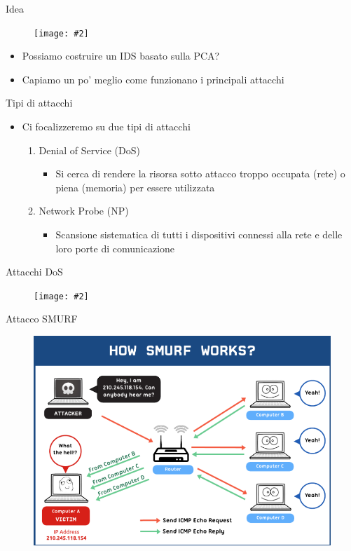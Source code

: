 \documentclass[xcolor={dvipsnames}]{beamer}%
\newcommand{\figcen}[2]{
	\begin{figure}
		\begin{center}
			\texttt{[image: \#2]}
		\end{center}
	\end{figure}
}
\begin{document}
		\begin{frame}{Idea}
			\figcen{.3\textwidth}{idea}
			\begin{itemize}
				\item Possiamo costruire un IDS basato sulla PCA?
				\item Capiamo un po' meglio come funzionano i principali attacchi
			\end{itemize}
		\end{frame}

		\begin{frame}{Tipi di attacchi}
			\begin{itemize}
				\item Ci focalizzeremo su due tipi di attacchi
				\begin{enumerate}
					\footnotesize
					\item Denial of Service (DoS)
					\begin{itemize}
						\footnotesize
						\item Si cerca di rendere la risorsa sotto attacco troppo occupata (rete) o piena (memoria) per essere utilizzata
					\end{itemize}
					\item Network Probe (NP)
					\begin{itemize}
						\footnotesize
						\item Scansione sistematica di tutti i dispositivi connessi alla rete e delle loro porte di comunicazione
					\end{itemize}
				\end{enumerate}
			\end{itemize}
		\end{frame}
	
		\begin{frame}{Attacchi DoS}
			\figcen{.8\textwidth}{dos}
		\end{frame}
	
		\begin{frame}{Attacco SMURF}
			\begin{figure}
				\begin{center}
					\includegraphics[width=.75\textwidth]{smurf}
				\end{center}
			\end{figure}
		\end{frame}
	
\end{document}
